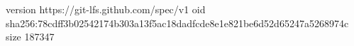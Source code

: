 version https://git-lfs.github.com/spec/v1
oid sha256:78cdff3b02542174b303a13f5ac18dadfcde8e1e821be6d52d65247a5268974c
size 187347
